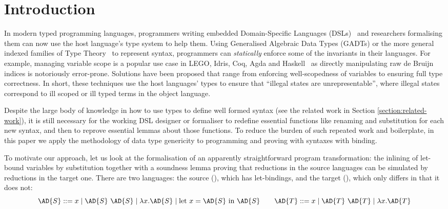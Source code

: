 
\newcommand{\semrec}{\AR{Semantics}}
\newcommand{\semfun}{\AF{semantics}}

\section{Introduction}

In modern typed programming languages, programmers writing embedded
Domain-Specific Languages (DSLs)~\cite{hudak1996building} and researchers formalising them can now
use the host language's type system to help them. Using Generalised
Algebraic Data Types (GADTs) or the more general indexed families of
Type Theory~\cite{dybjer1994inductive} to represent syntax,
programmers can \emph{statically} enforce some of the invariants in
their languages. For example, managing variable scope is a popular use
case in LEGO, Idris, Coq, Agda and
Haskell~\cite{altenkirch1999monadic,DBLP:conf/gpce/BradyH06,DBLP:journals/jar/HirschowitzM12,DBLP:conf/icfp/KeuchelJ12,BachPoulsen,plfa2018,eisenbergsticth18}
as directly manipulating raw de Bruijn indices is notoriously
error-prone. Solutions have been proposed that range from enforcing
well-scopedness of variables to ensuring full type correctness. In
short, these techniques use the host languages' types to ensure that
``illegal states are unrepresentable'', where illegal states
correspond to ill scoped or ill typed terms in the object language.

Despite the large body of knowledge in how to use types to define well
formed syntax (see the related work in Section
\ref{section:related-work}), it is still necessary for the working DSL
designer or formaliser to redefine essential functions like renaming
and substitution for each new syntax, and then to reprove essential
lemmas about those functions. To reduce the burden of such repeated
work and boilerplate, in this paper we apply the methodology of
data type genericity to programming and proving with syntaxes with
binding.

To motivate our approach, let us look at the formalisation of an
apparently straightforward program transformation: the inlining of
let-bound variables by substitution together with a soundness lemma
proving that reductions in the source languages can be simulated by
reductions in the target one. There are two languages: the source
(), which has let-bindings, and the target (), which only
differs in that it does not:
\begin{displaymath}
  \AD{S} ::= x \mid \AD{S}~\AD{S} \mid \lambda x. \AD{S} \mid \textrm{let }x=\AD{S}\textrm{ in }\AD{S}
  \qquad
  \AD{T} ::= x \mid \AD{T}~\AD{T} \mid \lambda x. \AD{T}
\end{displaymath}

